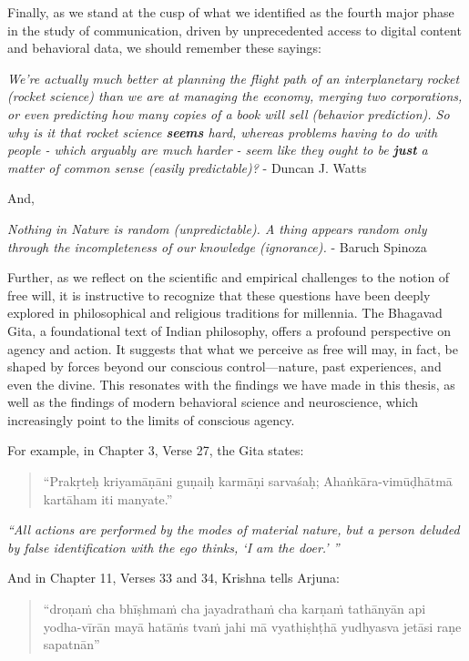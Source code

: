 Finally, as we stand at the cusp of what we identified as the fourth major phase in the study of communication, driven by unprecedented access to digital content and behavioral data, we should remember these sayings:

\textit{We're actually much better at planning the flight path of an interplanetary rocket (rocket science) than we are at managing the economy, merging two corporations, or even predicting how many copies of a book will sell (behavior prediction). So why is it that rocket science \textbf{seems} hard, whereas problems having to do with people - which arguably are much harder - seem like they ought to be \textbf{just} a matter of common sense (easily predictable)?} - Duncan J. Watts       

\begin{center}
    And,
\end{center}

\textit{Nothing in Nature is random (unpredictable). A thing appears random only through the incompleteness of our knowledge (ignorance).} - Baruch Spinoza


Further, as we reflect on the scientific and empirical challenges to the notion of free will, it is instructive to recognize that these questions have been deeply explored in philosophical and religious traditions for millennia. The Bhagavad Gita, a foundational text of Indian philosophy, offers a profound perspective on agency and action. It suggests that what we perceive as free will may, in fact, be shaped by forces beyond our conscious control—nature, past experiences, and even the divine. This resonates with the findings we have made in this thesis, as well as the findings of modern behavioral science and neuroscience, which increasingly point to the limits of conscious agency.



For example, in Chapter 3, Verse 27, the Gita states:

\begin{quote}
    ``Prakṛteḥ kriyamāṇāni guṇaiḥ karmāṇi sarvaśaḥ;
    Ahaṅkāra-vimūḍhātmā kartāham iti manyate.''
\end{quote}

\textit{``All actions are performed by the modes of material nature, but a person deluded by false identification with the ego thinks, `I am the doer.' ''}

And in Chapter 11, Verses 33 and 34, Krishna tells Arjuna:

\begin{quote}
    ``droṇaṁ cha bhīṣhmaṁ cha jayadrathaṁ cha
    karṇaṁ tathānyān api yodha-vīrān 
    mayā hatāṁs tvaṁ jahi mā vyathiṣhṭhā
    yudhyasva jetāsi raṇe sapatnān''
\end{quote}

